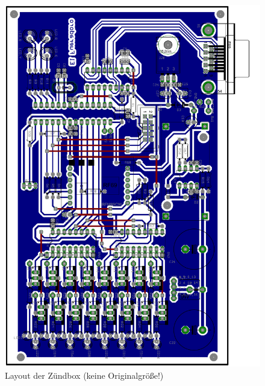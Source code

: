 \documentclass[paper=a4, parskip, numbers=noenddot, toc=listof, headsepline]{scrbook}
\begin{document}
		\begin{figure}
			\centering
			\includegraphics[height=.95\textheight,keepaspectratio]{Bilder/Zuendboxlayout}
			\caption{Layout der Zündbox (keine Originalgröße!)}
			\label{fig:zuendboxlayout}
		\end{figure}
\end{document}

